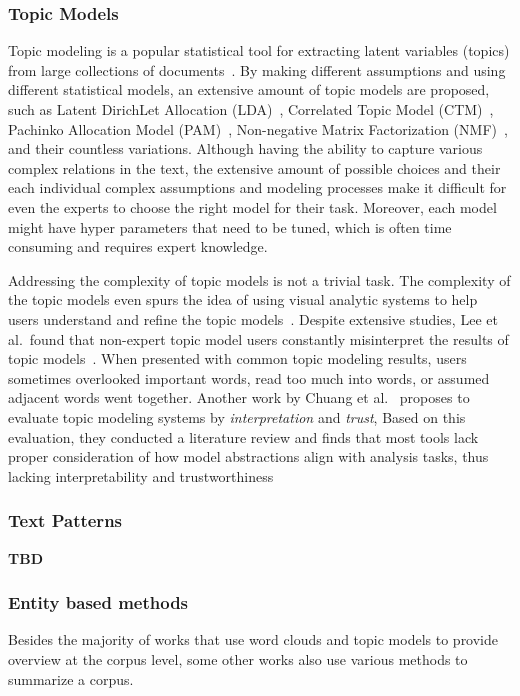 \subsubsection{Topic Models}
Topic modeling is a popular statistical tool for extracting latent variables (topics) from large collections of documents~\cite{vayansky2020topicreview}.
By making different assumptions and using different statistical models, an extensive amount of topic models are proposed,
such as Latent DirichLet Allocation (LDA)~\cite{blei2003LDA}, Correlated Topic Model (CTM)~\cite{blei2006correlated}, Pachinko Allocation Model (PAM)~\cite{li2006pachinko}, Non-negative Matrix Factorization (NMF)~\cite{lee1999NMF},
and their countless variations.
Although having the ability to capture various complex relations in the text, the extensive amount of possible choices and their each individual complex assumptions and modeling processes make it difficult for even the experts to choose the right model for their task.
Moreover, each model might have hyper parameters that need to be tuned, which is often time consuming and requires expert knowledge.

Addressing the complexity of topic models is not a trivial task.
The complexity of the topic models even spurs the idea of using visual analytic systems to help users understand and refine the topic models~\cite{el2017progressive, choo2013utopian, lee2012ivisclustering, kim2016topiclens, chaney2012visualizing, gretarsson2012topicnets}.
Despite extensive studies, Lee et al.\ found that non-expert topic model users constantly misinterpret the results of topic models~\cite{lee2017human}. 
When presented with common topic modeling results, users sometimes overlooked important words, read too much into words, or assumed adjacent words went together.
Another work by Chuang et al.~\cite{chuang2012interpretation} proposes to evaluate topic modeling systems by \textit{interpretation} and \textit{trust},
Based on this evaluation, they conducted a literature review and finds that most tools lack proper consideration of how model abstractions align with analysis tasks, thus lacking interpretability and trustworthiness

\subsubsection{Text Patterns}
\textbf{TBD}
\subsubsection{Entity based methods}
Besides the majority of works that use word clouds and topic models to provide overview at the corpus level,
some other works also use various methods to summarize a corpus.


